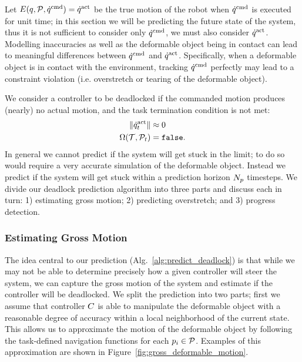 Let $E(q, \mathcal{P}, \dot{q}^{\textrm{cmd}}) = \dot{q}^{\textrm{act}}$ be the true motion of the robot when $\dot{q}^{\textrm{cmd}}$ is executed for unit time; in this section we will be predicting the future state of the system, thus it is not sufficient to consider only $\dot{q}^{\textrm{cmd}}$, we must also consider $\dot{q}^{\textrm{act}}$.  Modelling inaccuracies as well as the deformable object being in contact can lead to meaningful differences between $\dot{q}^{\textrm{cmd}}$ and $\dot{q}^{\textrm{act}}$. Specifically, when a deformable object is in contact with the environment, tracking $\dot{q}^{\textrm{cmd}}$ perfectly may lead to a constraint violation (i.e. overstretch or tearing of the deformable object).

We consider a controller to be deadlocked if the commanded motion produces (nearly) no actual motion, and the task termination condition is not met:
\begin{equation}
    \begin{split}
        \| \dot{q}^{\textrm{act}}_t \|                &\approx 0 \\
        \Omega(\mathcal{T}, \mathcal{P}_t) &= \texttt{false}.
        \label{eqn:stuck}
    \end{split}
\end{equation}
In general we cannot predict if the system will get stuck in the limit; to do so would require a very accurate simulation of the deformable object. Instead we predict if the system will get stuck within a prediction horizon $N_p$ timesteps. We divide our deadlock prediction algorithm into three parts and discuss each in turn: 1) estimating gross motion; 2) predicting overstretch; and 3) progress detection.

\subsubsection{Estimating Gross Motion}

The idea central to our prediction (Alg.~\ref{alg:predict_deadlock}) is that while we may not be able to determine precisely how a given controller will steer the system, we can capture the gross motion of the system and estimate if the controller will be deadlocked. We split the prediction into two parts; first we assume that controller $C$ is able to manipulate the deformable object with a reasonable degree of accuracy within a local neighborhood of the current state. This allows us to approximate the motion of the deformable object by following the task-defined navigation functions for each $p_i \in \mathcal{P}$. Examples of this approximation are shown in Figure~\ref{fig:gross_deformable_motion}.

